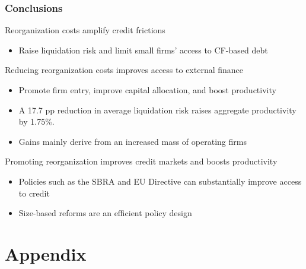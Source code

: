\documentclass[aspectratio=169,xcolor=table]{beamer}
\begin{document}
\begin{frame}[label=3] \frametitle{Conclusions}

Reorganization costs amplify credit frictions
\begin{itemize} \small
    \item Raise liquidation risk and limit small firms' access to CF-based debt
\end{itemize} \normalsize \vspace{5mm}

Reducing reorganization costs improves access to external finance
\begin{itemize} \small
     \item Promote firm entry, improve capital allocation, and boost productivity
     \item A 17.7 pp reduction in average liquidation risk raises aggregate productivity by 1.75\%.
     \item Gains mainly derive from an increased mass of operating firms
\end{itemize} \normalsize \vspace{5mm}

Promoting reorganization improves credit markets and boosts productivity
\begin{itemize} \small
\item Policies such as the SBRA and EU Directive can substantially improve access to credit
\item Size-based reforms are an efficient policy design
\end{itemize} \normalsize


\end{frame}


\appendix
\section{Appendix}
\end{document}
